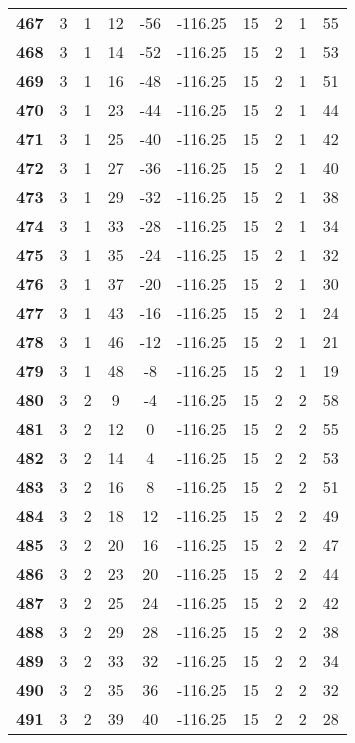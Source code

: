 \documentclass[12pt,letterpaper, onecolumn]{exam}
\begin{document}
\begin{longtable}{cccccccccc}
    \textbf{467} & 3 & 1 & 12 & -56 & -116.25 & 15 & 2 & 1 & 55 \\ 
    \textbf{468} & 3 & 1 & 14 & -52 & -116.25 & 15 & 2 & 1 & 53 \\ 
    \textbf{469} & 3 & 1 & 16 & -48 & -116.25 & 15 & 2 & 1 & 51 \\ 
    \textbf{470} & 3 & 1 & 23 & -44 & -116.25 & 15 & 2 & 1 & 44 \\ 
    \textbf{471} & 3 & 1 & 25 & -40 & -116.25 & 15 & 2 & 1 & 42 \\ 
    \textbf{472} & 3 & 1 & 27 & -36 & -116.25 & 15 & 2 & 1 & 40 \\ 
    \textbf{473} & 3 & 1 & 29 & -32 & -116.25 & 15 & 2 & 1 & 38 \\ 
    \textbf{474} & 3 & 1 & 33 & -28 & -116.25 & 15 & 2 & 1 & 34 \\ 
    \textbf{475} & 3 & 1 & 35 & -24 & -116.25 & 15 & 2 & 1 & 32 \\ 
    \textbf{476} & 3 & 1 & 37 & -20 & -116.25 & 15 & 2 & 1 & 30 \\ 
    \textbf{477} & 3 & 1 & 43 & -16 & -116.25 & 15 & 2 & 1 & 24 \\ 
    \textbf{478} & 3 & 1 & 46 & -12 & -116.25 & 15 & 2 & 1 & 21 \\ 
    \textbf{479} & 3 & 1 & 48 & -8 & -116.25 & 15 & 2 & 1 & 19 \\ 
    \textbf{480} & 3 & 2 & 9 & -4 & -116.25 & 15 & 2 & 2 & 58 \\ 
    \textbf{481} & 3 & 2 & 12 & 0 & -116.25 & 15 & 2 & 2 & 55 \\ 
    \textbf{482} & 3 & 2 & 14 & 4 & -116.25 & 15 & 2 & 2 & 53 \\ 
    \textbf{483} & 3 & 2 & 16 & 8 & -116.25 & 15 & 2 & 2 & 51 \\      \hline
    \textbf{484} & 3 & 2 & 18 & 12 & -116.25 & 15 & 2 & 2 & 49 \\ 
    \textbf{485} & 3 & 2 & 20 & 16 & -116.25 & 15 & 2 & 2 & 47 \\ 
    \textbf{486} & 3 & 2 & 23 & 20 & -116.25 & 15 & 2 & 2 & 44 \\ 
    \textbf{487} & 3 & 2 & 25 & 24 & -116.25 & 15 & 2 & 2 & 42 \\ 
    \textbf{488} & 3 & 2 & 29 & 28 & -116.25 & 15 & 2 & 2 & 38 \\ 
    \textbf{489} & 3 & 2 & 33 & 32 & -116.25 & 15 & 2 & 2 & 34 \\ 
    \textbf{490} & 3 & 2 & 35 & 36 & -116.25 & 15 & 2 & 2 & 32 \\ 
    \textbf{491} & 3 & 2 & 39 & 40 & -116.25 & 15 & 2 & 2 & 28 \\ 

\end{longtable}
\end{document}
